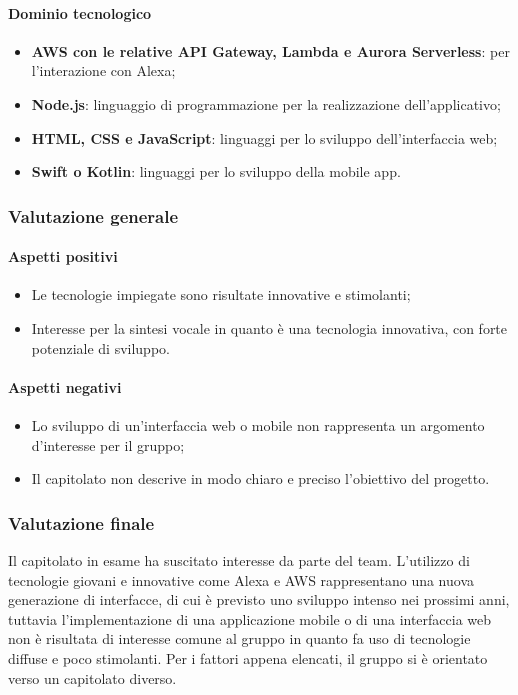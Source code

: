 {\paragraph{Dominio tecnologico}
\begin{itemize}
	\item {\textbf{AWS con le relative API Gateway, Lambda e Aurora Serverless}: per l'interazione con Alexa};
	\item  \textbf{Node.js}: linguaggio di programmazione per la realizzazione dell'applicativo;
	\item \textbf{HTML, CSS e JavaScript}: linguaggi per lo sviluppo dell'interfaccia web;
	\item  \textbf{Swift o Kotlin}: linguaggi per lo sviluppo della mobile app.
\end{itemize}
\subsubsection{Valutazione generale}
\paragraph{Aspetti positivi}
\begin{itemize}
	\item{Le tecnologie impiegate sono risultate innovative e stimolanti;}
	\item{Interesse per la sintesi vocale in quanto è una tecnologia innovativa, con forte potenziale di sviluppo.}
\end{itemize}
\paragraph{Aspetti negativi}
\begin{itemize}
	\item{Lo sviluppo di un'interfaccia web o mobile non rappresenta un argomento d'interesse per il gruppo;}
	\item{Il capitolato non descrive in modo chiaro e preciso l'obiettivo del progetto.}
\end{itemize}
\subsubsection{Valutazione finale}
Il capitolato in esame ha suscitato interesse da parte del team. L'utilizzo di tecnologie giovani e innovative come Alexa e AWS rappresentano una nuova generazione di interfacce, di cui è previsto uno sviluppo intenso nei prossimi anni, tuttavia l'implementazione di una applicazione mobile o di una interfaccia web non è risultata di interesse comune al gruppo in quanto fa uso di tecnologie diffuse e poco stimolanti.
Per i fattori appena elencati, il gruppo si è orientato verso un capitolato diverso.

}
